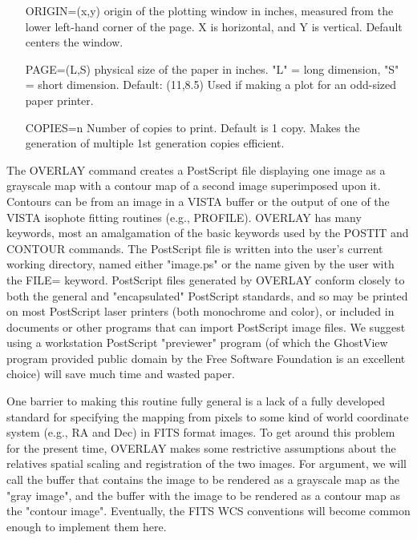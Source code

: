\begin{itemize}
{                         Portrait:  6" x 6"\newline
                         Landscape: 8" x 5"\newline
                  Must be smaller than the paper dimensions (see PAGE).}
  \item[ORIGIN=(x,y)]{origin of the plotting window in inches, measured from 
                  the lower left-hand corner of the page.  X is horizontal, 
                  and Y is vertical.  Default centers the window.}
  \item[PAGE=(L,S)]{physical size of the paper in inches.  "L" = long 
                  dimension, "S" = short dimension.  Default: (11,8.5)
                  Used if making a plot for an odd-sized paper printer.}
  \item[COPIES=n]{Number of copies to print.  Default is 1 copy.  Makes the
                  generation of multiple 1st generation copies efficient.}
\end{itemize}

The OVERLAY command creates a PostScript file displaying one image as a
grayscale map with a contour map of a second image superimposed upon it.
Contours can be from an image in a VISTA buffer or the output of one of the
VISTA isophote fitting routines (e.g., PROFILE).  OVERLAY has many
keywords, most an amalgamation of the basic keywords used by the POSTIT and
CONTOUR commands.  The PostScript file is written into the user's current
working directory, named either "image.ps" or the name given by the user
with the FILE= keyword.  PostScript files generated by OVERLAY conform
closely to both the general and "encapsulated" PostScript standards, and so
may be printed on most PostScript laser printers (both monochrome and
color), or included in documents or other programs that can import
PostScript image files.  We suggest using a workstation PostScript
"previewer" program (of which the GhostView program provided public domain
by the Free Software Foundation is an excellent choice) will save much time
and wasted paper.

One barrier to making this routine fully general is a lack of a fully
developed standard for specifying the mapping from pixels to some kind of
world coordinate system (e.g., RA and Dec) in FITS format images.  To get
around this problem for the present time, OVERLAY makes some restrictive
assumptions about the relatives spatial scaling and registration of the two
images.  For argument, we will call the buffer that contains the image to
be rendered as a grayscale map as the "gray image", and the buffer with the
image to be rendered as a contour map as the "contour image".  Eventually,
the FITS WCS conventions will become common enough to implement them here.

